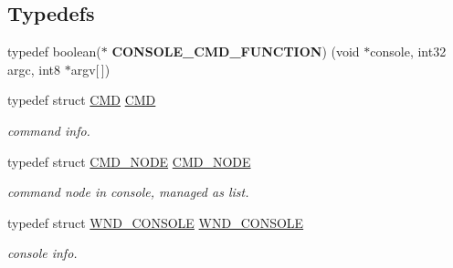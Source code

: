 \subsection*{Typedefs}
\begin{DoxyCompactItemize}
\item 
\hypertarget{group__console_ga478e7095fade919c1056a1279be2454c}{}typedef boolean($\ast$ {\bfseries C\+O\+N\+S\+O\+L\+E\+\_\+\+C\+M\+D\+\_\+\+F\+U\+N\+C\+T\+I\+O\+N}) (void $\ast$console, int32 argc, int8 $\ast$argv\mbox{[}$\,$\mbox{]})\label{group__console_ga478e7095fade919c1056a1279be2454c}

\item 
typedef struct \hyperlink{struct_c_m_d}{C\+M\+D} \hyperlink{group__console_ga9bdb805ff76fea569f65a522f969af43}{C\+M\+D}
\begin{DoxyCompactList}\small\item\em command info. \end{DoxyCompactList}\item 
typedef struct \hyperlink{struct_c_m_d___n_o_d_e}{C\+M\+D\+\_\+\+N\+O\+D\+E} \hyperlink{group__console_gabbfca59e8c7e8712bd8ed280f5c5de2b}{C\+M\+D\+\_\+\+N\+O\+D\+E}
\begin{DoxyCompactList}\small\item\em command node in console, managed as list. \end{DoxyCompactList}\item 
typedef struct \hyperlink{struct_w_n_d___c_o_n_s_o_l_e}{W\+N\+D\+\_\+\+C\+O\+N\+S\+O\+L\+E} \hyperlink{group__console_ga23e39e75eb31966dd226f03db68a6aae}{W\+N\+D\+\_\+\+C\+O\+N\+S\+O\+L\+E}
\begin{DoxyCompactList}\small\item\em console info. \end{DoxyCompactList}\end{DoxyCompactItemize}
